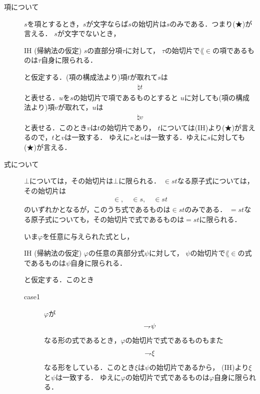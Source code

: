 	\begin{metaprf}\mbox{}
		\begin{description}
			\item[項について]
				$s$を項とするとき，$s$が文字ならば$s$の始切片は$s$のみである．つまり(★)が言える．
				$s$が文字でないとき，
				\begin{itembox}[l]{IH (帰納法の仮定)}
					$s$の直部分項$\tau$に対して，
					$\tau$の始切片で$\lang{\in}$の項であるものは$\tau$自身に限られる．
				\end{itembox}
				と仮定する．(項の構成法より)項$t$が取れて$s$は
				\begin{align}
					\natural t
				\end{align}
				と表せる．$u$を$s$の始切片で項であるものとすると
				$u$に対しても(項の構成法より)項$v$が取れて，$u$は
				\begin{align}
					\natural v
				\end{align}
				と表せる．このとき$v$は$t$の始切片であり，
				$t$については(IH)より(★)が言えるので，$t$と$v$は一致する．
				ゆえに$s$と$u$は一致する．ゆえに$s$に対しても(★)が言える．
				
			\item[式について]
				$\bot$については，その始切片は$\bot$に限られる．
				$\in st$なる原子式については，その始切片は
				\begin{align}
					\in, \quad \in s, \quad \in st
				\end{align}
				のいずれかとなるが，このうち式であるものは$\in st$のみである．
				$=st$なる原子式についても，その始切片で式であるものは$=st$に限られる．
	
				いま$\varphi$を任意に与えられた式とし，
				\begin{itembox}[l]{IH (帰納法の仮定)}
					$\varphi$の任意の真部分式$\psi$に対して，
					$\psi$の始切片で$\lang{\in}$の式であるものは$\psi$自身に限られる．
				\end{itembox}
				と仮定する．このとき
				\begin{description}
					\item[case1] $\varphi$が
						\begin{align}
							\rightharpoondown\hspace{-0.25em} \psi
						\end{align}
						なる形の式であるとき，$\varphi$の始切片で式であるものもまた
						\begin{align}
							\rightharpoondown\hspace{-0.25em} \xi
						\end{align}
						なる形をしている．このとき$\xi$は$\psi$の始切片であるから，
						(IH)より$\xi$と$\psi$は一致する．
						ゆえに$\varphi$の始切片で式であるものは$\varphi$自身に限られる．
			

\end{description}
\end{description}
\end{metaprf}
